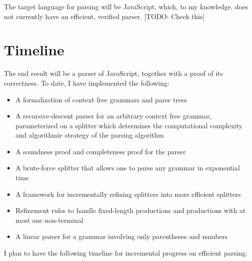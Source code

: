\documentclass{article}
\begin{document}
  The target language for parsing will be JavaScript, which, to my knowledge, does not currently have an efficient, verified parser.   [TODO: Check this]
  
  
\section{Timeline}
  The end result will be a parser of JavaScript, together with a proof of its correctness.  To date, I have implemented the following:
  \begin{itemize}
    \item A formalization of context free grammars and parse trees
    \item A recursive-descent parser for an arbitrary context free grammar, parameterized on a splitter which determines the computational complexity and algorithmic strategy of the parsing algorithm
    \item A soundness proof and completeness proof for the parser
    \item A brute-force splitter that allows one to parse any grammar in exponential time
    \item A framework for incrementally refining splitters into more efficient splitters
    \item Refinement rules to handle fixed-length productions and productions with at most one non-terminal
    \item A linear parser for a grammar involving only parentheses and numbers
  \end{itemize}
  
  I plan to have the following timeline for incremental progress on efficient parsing:
  
\end{document}
